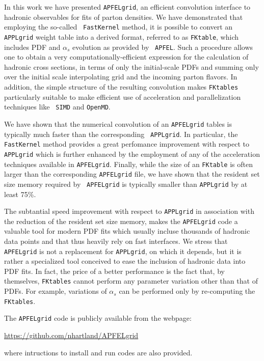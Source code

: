 \documentclass[preprint,12pt]{elsarticle}
\begin{document}
In this work we have presented {\tt APFELgrid}, an efficient
convolution interface to hadronic observables for fits of parton
densities. We have demonstrated that employing the so-called {\tt
  FastKernel} method, it is possible to convert an {\tt APPLgrid}
weight table into a derived format, referred to as {\tt FKtable},
which includes PDF and $\alpha_s$ evolution as provided by {\tt
  APFEL}.  Such a procedure allows one to obtain a very
computationally-efficient expression for the calculation of hadronic
cross sections, in terms of only the initial-scale PDFs and summing
only over the initial scale interpolating grid and the incoming parton
flavors. In addition, the simple structure of the resulting
convolution makes {\tt FKtables} particularly suitable to make
efficient use of acceleration and parallelization techniques like {\tt
  SIMD} and {\tt OpenMD}.

We have shown that the numerical convolution of an {\tt APFELgrid}
tables is typically much faster than the corresponding {\tt
  APPLgrid}. In particular, the {\tt FastKernel} method provides a
great perfomance improvement with respect to {\tt APPLgrid} which is
further enhanced by the employment of any of the acceleration
techniques available in {\tt APFELgrid}. Finally, while the size of an
{\tt FKtable} is often larger than the corresponding {\tt APFELgrid}
file, we have shown that the resident set size memory required by {\tt
  APFELgrid} is typically smaller than {\tt APPLgrid} by at least
75\%.

The subtantial speed improvement with respect to {\tt APPLgrid} in
association with the reduction of the resident set size memory, makes
the {\tt APFELgrid} code a valuable tool for modern PDF fits which
usually incluse thousands of hadronic data points and that thus
heavily rely on fast interfaces. We stress that {\tt APFELgrid} is not
a replacement for {\tt APPLgrid}, on which it depends, but it is
rather a specialized tool conceived to ease the inclusion of hadronic
data into PDF fits. In fact, the price of a better performance is the
fact that, by themselves, {\tt FKtables} cannot perform any parameter
variation other than that of PDFs. For example, variations of
$\alpha_s$ can be performed only by re-computing the {\tt FKtables}.

The {\tt APFELgrid} code is publicly available from the webpage:
\begin{center}
\url{https://github.com/nhartland/APFELgrid}
\end{center}
where intructions to install and run codes are also provided.
\end{document}
